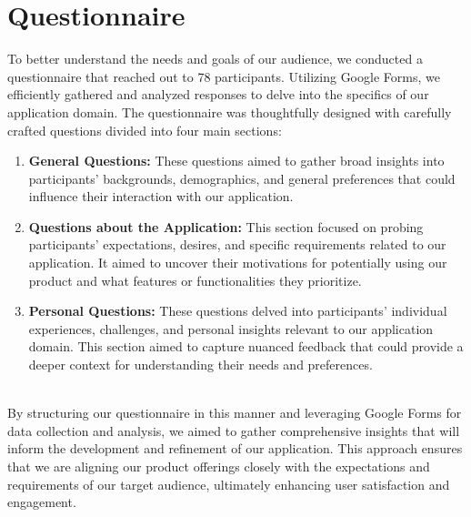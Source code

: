 \section{Questionnaire}
To better understand the needs and goals of our audience, we conducted a questionnaire that reached out to 78 participants. Utilizing Google Forms, we efficiently gathered and analyzed responses to delve into the specifics of our application domain. The questionnaire was thoughtfully designed with carefully crafted questions divided into four main sections:

\begin{enumerate}
	\item \textbf{General Questions:}
	These questions aimed to gather broad insights into participants' backgrounds, demographics, and general preferences that could influence their interaction with our application.
	
	\item \textbf{Questions about the Application:}
	This section focused on probing participants' expectations, desires, and specific requirements related to our application. It aimed to uncover their motivations for potentially using our product and what features or functionalities they prioritize.
	
	\item \textbf{Personal Questions:}
	These questions delved into participants' individual experiences, challenges, and personal insights relevant to our application domain. This section aimed to capture nuanced feedback that could provide a deeper context for understanding their needs and preferences.
	
\end{enumerate}
\\
By structuring our questionnaire in this manner and leveraging Google Forms for data collection and analysis, we aimed to gather comprehensive insights that will inform the development and refinement of our application. This approach ensures that we are aligning our product offerings closely with the expectations and requirements of our target audience, ultimately enhancing user satisfaction and engagement.\\
\clearpage
